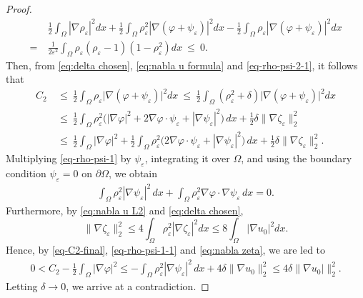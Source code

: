 \documentclass[a4paper,10pt,reqno]{amsart}
\theoremstyle{definition}
\newcommand{\ve}{{\varepsilon}}
\newcommand{\Om}{{\Omega}}
\numberwithin{equation}{section}
\begin{document}
\begin{proof}
\begin{equation}
\begin{aligned}
&\frac12\int_\Omega |\nabla \rho_\varepsilon|^2  dx +
\frac12 \int_\Omega\rho_\ve^2 | \nabla (\varphi + \psi_\varepsilon )|^2 dx - \frac12 \int_\Omega \rho_\ve | \nabla (\varphi + \psi_\varepsilon )|^2 dx \\
=~& \frac{1}{2\ve^2}\int_\Omega \rho_\ve( \rho_\varepsilon - 1)(1- \rho_\ve^2) dx  ~\leq~ 0.
\end{aligned}
\end{equation}
Then,  from   \eqref{eq:delta chosen},  \eqref{eq:nabla u formula} and \eqref{eq-rho-psi-2-1}, it follows that
\begin{equation}\label{eq-C2-final}
\begin{aligned}
C_2 ~&\le ~   \frac12
\int_\Omega\rho_\ve \big| \nabla (\varphi + \psi_\varepsilon )\big|^2 dx
 ~ \leq~   \frac12   \int_\Omega (\rho_\varepsilon^2+\delta)  \big| \nabla (\varphi + \psi_\varepsilon )\big|^2  dx \\
&  \le ~   \frac12   \int_\Omega  \rho_\varepsilon^2   \big( | \nabla  \varphi |^2 +2 \nabla  \varphi \cdot  \psi_\varepsilon +|\nabla \psi_\varepsilon|^2  \big)\,  dx + \frac12 \delta    \| \nabla \zeta_\ve \|_2^2 \\
&  \le ~  \frac12   \int_\Omega     | \nabla  \varphi |^2 +\frac12   \int_\Omega  \rho_\varepsilon^2   \big(2 \nabla  \varphi \cdot  \psi_\varepsilon +|\nabla \psi_\varepsilon|^2  \big)\,  dx  +   \frac12 \delta    \| \nabla \zeta_\ve \|_2^2 .
\end{aligned}
\end{equation}
Multiplying \eqref{eq-rho-psi-1} by \( \psi_\varepsilon \), integrating it over \( \Omega \), and using the boundary condition \( \psi_\varepsilon = 0 \) on \( \partial\Omega \), we obtain
\begin{align}\label{eq-rho-psi-1-1}
  \int_\Omega \rho_\varepsilon^2 \left| \nabla \psi_\varepsilon \right|^2 \, dx  +\int_\Omega \rho_\varepsilon^2 \nabla \varphi \cdot \nabla \psi_\varepsilon \, dx =0.
\end{align}
Furthermore, by \eqref{eq:nabla u L2} and \eqref{eq:delta chosen},
\begin{equation}\label{eq:nabla zeta}
   \| \nabla \zeta_\ve \|_2^2 \le 4 \int_\Om \rho_\ve^2 | \nabla \zeta_\ve|^2 dx \le 8 \int_\Om |\nabla u_0|^2 dx.
\end{equation}
Hence, by   \eqref{eq-C2-final},  \eqref{eq-rho-psi-1-1} and \eqref{eq:nabla zeta}, we are led to
\begin{align*}
 0< C_2 -   \frac12   \int_\Omega     | \nabla  \varphi |^2 \le   -   \int_\Omega \rho_\varepsilon^2 \left| \nabla \psi_\varepsilon \right|^2 \, dx+  4 \delta  \|\nabla u_0 \|_2^2 \le   4 \delta   \|\nabla u_0|\|_2^2.
\end{align*}
Letting $\delta \to 0$, we arrive at  a contradiction.
\end{proof}
\end{document}
